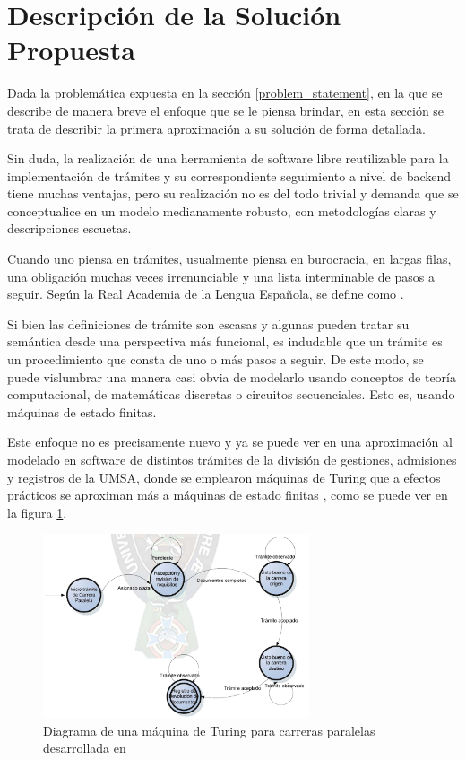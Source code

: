 \section{Descripción de la Solución Propuesta}
Dada la problemática expuesta en la sección \ref{problem_statement}, en la que
se describe de manera breve el enfoque que se le piensa brindar, en esta sección
se trata de describir la primera aproximación a su solución de forma detallada.

Sin duda, la realización de una herramienta de software libre reutilizable para
la implementación de trámites y su correspondiente seguimiento a nivel de
backend tiene muchas ventajas, pero su realización no es del todo trivial y
demanda que se conceptualice en un modelo medianamente robusto, con metodologías
claras y descripciones escuetas.

Cuando uno piensa en trámites, usualmente piensa en burocracia, en largas filas,
una obligación muchas veces irrenunciable y una lista interminable de pasos a
seguir. Según la Real Academia de la Lengua Española, se define como  \parencite{asaleDiccionarioLenguaEspanola}.

Si bien las definiciones de trámite son escasas y algunas pueden tratar su
semántica desde una perspectiva más funcional, es indudable que un trámite es un
procedimiento que consta de uno o más pasos a seguir. De este modo, se puede
vislumbrar una manera casi obvia de modelarlo usando conceptos de teoría
computacional, de matemáticas discretas o circuitos secuenciales. Esto es,
usando máquinas de estado finitas.

Este enfoque no es precisamente nuevo y ya se puede ver en una aproximación al
modelado en software de distintos trámites de la división de gestiones,
admisiones y registros de la UMSA, donde se emplearon máquinas de Turing que a
efectos prácticos se aproximan más a máquinas de estado finitas
\parencite{nachoSISTEMACONTROLTRAMITES2007}, como se puede ver en la figura
\ref{fig:nachocarreraparalela}.

\begin{figure}
	\centering
	\includegraphics[width=0.7\textwidth]{assets/carreraparalelanacho}
	\caption{Diagrama de una máquina de Turing para carreras paralelas
	desarrollada en \cite{nachoSISTEMACONTROLTRAMITES2007}}
	\label{fig:nachocarreraparalela}
\end{figure}

